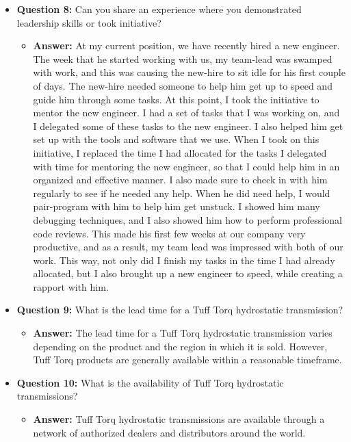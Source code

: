 \documentclass{article}
\begin{document}
\begin{itemize}
    \item \textbf{Question 8:} Can you share an experience where you demonstrated leadership skills or took initiative?
    \begin{itemize}
        \item \textbf{Answer:} At my current position, we have recently hired
        a new engineer. The week that he started working with us, my team-lead was swamped
        with work, and this was causing the new-hire to sit idle for his first
        couple of days. The new-hire needed someone to help him get up
        to speed and guide him through some tasks.
        At this point, I took the initiative to mentor the new engineer.
        I had a set of tasks that I was working on, and I delegated some
        of these tasks to the new engineer. I also helped him get set up
        with the tools and software that we use. When I took on this initiative,
        I replaced the time I had allocated for the tasks I delegated
        with time for mentoring the new engineer, so that I could
        help him in an organized and effective manner.
        I also made sure to check in with him
        regularly to see if he needed any help. When he did need help,
        I would pair-program with him to help him get unstuck. I showed him
        many debugging techniques, and I also showed him how to perform
        professional code reviews. This made his first few weeks at our
        company very productive, and as a result, my team lead was
        impressed with both of our work. This way, not only did I finish my tasks
        in the time I had already allocated, but I also brought up a new
        engineer to speed, while creating a rapport with him.
    \end{itemize}
    
    \item \textbf{Question 9:} What is the lead time for a Tuff Torq hydrostatic transmission?
    \begin{itemize}
        \item \textbf{Answer:} The lead time for a Tuff Torq hydrostatic transmission varies depending on the product and the region in which it is sold. However, Tuff Torq products are generally available within a reasonable timeframe.
    \end{itemize}
    
    \item \textbf{Question 10:} What is the availability of Tuff Torq hydrostatic transmissions?
    \begin{itemize}
        \item \textbf{Answer:} Tuff Torq hydrostatic transmissions are available through a network of authorized dealers and distributors around the world.
    \end{itemize}
    

\end{itemize}
\end{document}
